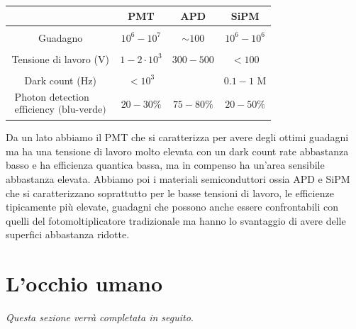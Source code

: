 \begin{center}
   \begin{tabular}{|c|c|c|c|}
      \hline
       & PMT & APD & SiPM\\
      \hline
      &&&\\[-0.45cm]
      Guadagno & $10^6-10^7$ & $\sim 100$ & $10^6-10^6$\\
      \hline
      &&&\\[-0.45cm]
      Tensione di lavoro (V) & $1-2 \cdot 10^3$ & $300 - 500$ & $<100$\\
      \hline
      &&&\\[-0.45cm]
      Dark count (Hz) & $<10^3$ & & $0.1-1$ M\\
      \hline
      $\begin{array}{cc}
         \text{Photon detection}\\
         \text{efficiency (blu-verde)}
      \end{array}$
      & $20-30\%$ & $75-80\%$ & $20-50\%$\\
      \hline
   \end{tabular}
\end{center}
Da un lato abbiamo il PMT che si caratterizza per avere degli ottimi guadagni ma ha una tensione di lavoro molto elevata con un dark count rate abbastanza basso e ha efficienza quantica bassa, ma in compenso ha un'area sensibile abbastanza elevata. Abbiamo poi i materiali semiconduttori ossia APD e SiPM che si caratterizzano soprattutto per le basse tensioni di lavoro, le efficienze tipicamente più elevate, guadagni che possono anche essere confrontabili con quelli del fotomoltiplicatore tradizionale ma hanno lo svantaggio di avere delle superfici abbastanza ridotte.

\section{L'occhio umano}

\textit{Questa sezione verrà completata in seguito}.

